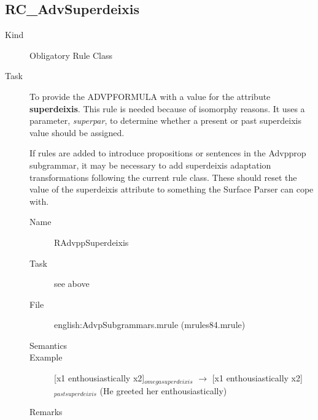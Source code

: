 \subsection{RC\_AdvSuperdeixis}
\begin{description}
\item[Kind] Obligatory Rule Class
\item[Task] To provide the ADVPFORMULA with a value for the attribute {\bf 
superdeixis}. This rule is needed because of isomorphy reasons. It uses a 
parameter, {\em superpar\/}, to determine whether a present or past superdeixis 
value should be assigned.

If rules are added to introduce propositions or sentences in the Advpprop 
subgrammar, it may be necessary to add superdeixis adaptation transformations 
following the current rule class. These should reset the value of the 
superdeixis attribute to something the Surface Parser can cope with.

\vspace{1 cm}
\begin{description}
\item[Name] RAdvppSuperdeixis
\item[Task] see above
\item[File] english:AdvpSubgrammars.mrule (mrules84.mrule)
\item[Semantics]
\item[Example] [x1 enthousiastically x2]$_{omegasuperdeixis}$ $\rightarrow$ 
[x1 enthousiastically x2]$_{pastsuperdeixis}$ (He greeted her enthousiastically)
\item[Remarks]
\end{description}

\end{description}




